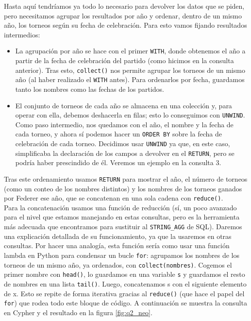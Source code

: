 Hasta aquí tendríamos ya todo lo necesario para devolver los datos que se piden, pero necesitamos agrupar los resultados por año y ordenar, dentro de un mismo año, los torneos según su fecha de celebración. Para esto vamos fijando resultados intermedios:
\begin{itemize}
\item La agrupación por año se hace con el primer \texttt{WITH}, donde obtenemos el año a partir de la fecha de celebración del partido (como hicimos en la consulta anterior). Tras esto, \texttt{collect()} nos permite agrupar los torneos de un mismo año (al haber realizado el \texttt{WITH} antes). Para ordenarlos por fecha, guardamos tanto los nombres como las fechas de los partidos. 
\item El conjunto de torneos de cada año se almacena en una colección y, para operar con ella, debemos deshacerla en filas; esto lo conseguimos con \texttt{UNWIND}. Como paso intermedio, nos quedamos con el año, el nombre y la fecha de cada torneo, y ahora sí podemos hacer un \texttt{ORDER BY} sobre la fecha de celebración de cada torneo. Decidimos usar \texttt{UNWIND} ya que, en este caso, simplificaba la declaración de los campos a devolver en el \texttt{RETURN}, pero se podría haber prescindido de él. Veremos un ejemplo en la consulta 3.
\end{itemize}

Tras este ordenamiento usamos \texttt{RETURN} para mostrar el año, el número de torneos (como un conteo de los nombres distintos) y los nombres de los torneos ganados por Federer ese año, que se concatenan en una sola cadena con \texttt{reduce()}. \\

Para la concatenación usamos una función de reducción (sí, un poco avanzado para el nivel que estamos manejando en estas consultas, pero es la herramienta más adecuada que encontramos para sustituir al \texttt{STRING\_AGG} de SQL). Daremos una explicación detallada de su funcionamiento, ya que la usaremos en otras consultas. Por hacer una analogía, esta función sería como usar una función lambda en Python para condensar un bucle \texttt{for}: agrupamos los nombres de los torneos de un mismo año, ya ordenados, con \texttt{collect(nombres)}. Cogemos el primer nombre con \texttt{head()}, lo guardamos en una variable \texttt{s} y guardamos el resto de nombres en una lista \texttt{tail()}. Luego, concatenamos s con el siguiente elemento de x. Esto se repite de forma iterativa gracias al \texttt{reduce()} (que hace el papel del \texttt{for}) que rodea todo este bloque de código. A continuación se muestra la consulta en Cypher y el resultado en la figura \ref{fig:q2_neo}.

